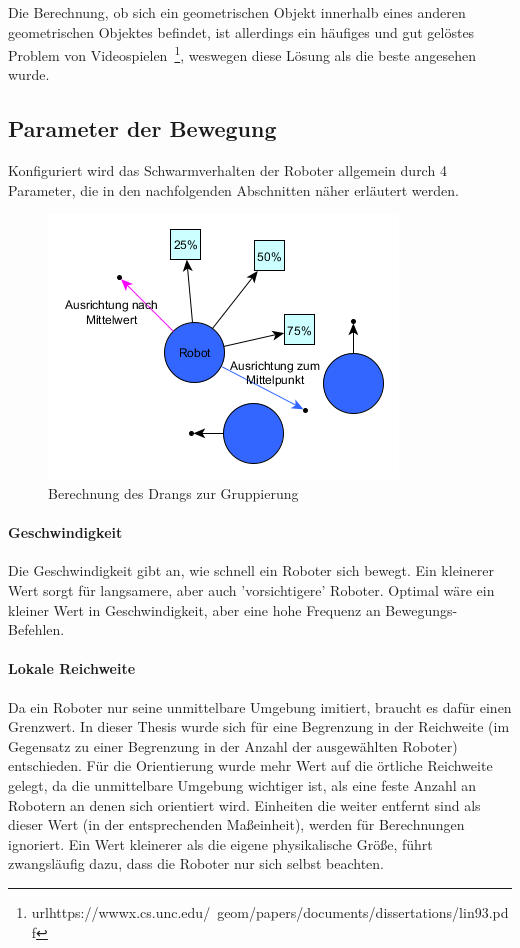 Die Berechnung, ob sich ein geometrischen Objekt innerhalb eines anderen geometrischen Objektes befindet, ist allerdings ein häufiges und gut gelöstes Problem von Videospielen~\footnote{url{https://wwwx.cs.unc.edu/~geom/papers/documents/dissertations/lin93.pdf}}, weswegen diese Lösung als die beste angesehen wurde.

\subsection*{Parameter der Bewegung}

Konfiguriert wird das Schwarmverhalten der Roboter allgemein durch 4 Parameter, die in den nachfolgenden Abschnitten näher erläutert werden.

\begin{figure}
	\includegraphics[width=\pictureWidthBig,keepaspectratio]{graphics/BerechnungDrangZurGruppe.png}
	\caption{Berechnung des Drangs zur Gruppierung}
	\label{pic:BerechnungDrangZurGruppe}
\end{figure}

\paragraph*{Geschwindigkeit} Die Geschwindigkeit gibt an, wie schnell ein Roboter sich bewegt. Ein kleinerer Wert sorgt für langsamere, aber auch 'vorsichtigere' Roboter. Optimal wäre ein kleiner Wert in Geschwindigkeit, aber eine hohe Frequenz an Bewegungs-Befehlen.

\paragraph*{Lokale Reichweite} Da ein Roboter nur seine unmittelbare Umgebung imitiert, braucht es dafür einen Grenzwert. In dieser Thesis wurde sich für eine Begrenzung in der Reichweite (im Gegensatz zu einer Begrenzung in der Anzahl der ausgewählten Roboter) entschieden. Für die Orientierung wurde mehr Wert auf die örtliche Reichweite gelegt, da die unmittelbare Umgebung wichtiger ist, als eine feste Anzahl an Robotern an denen sich orientiert wird. Einheiten die weiter entfernt sind als dieser Wert (in der entsprechenden Maßeinheit), werden für Berechnungen ignoriert. Ein Wert kleinerer als die eigene physikalische Größe, führt zwangsläufig dazu, dass die Roboter nur sich selbst beachten.

